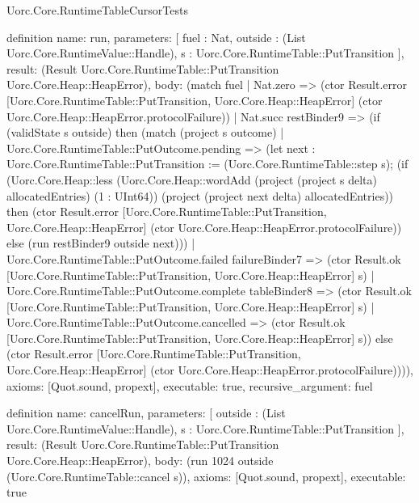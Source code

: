 \begin{lexlean}{Uorc.Core.RuntimeTableCursorTests}
\begin{semanticmodule}
definition{
  name: run,
  parameters: [
    fuel : Nat,
    outside : (List Uorc.Core.RuntimeValue::Handle),
    s : Uorc.Core.RuntimeTable::PutTransition
  ],
  result: (Result Uorc.Core.RuntimeTable::PutTransition Uorc.Core.Heap::HeapError),
  body: (match fuel
    | Nat.zero => (ctor Result.error [Uorc.Core.RuntimeTable::PutTransition, Uorc.Core.Heap::HeapError] (ctor Uorc.Core.Heap::HeapError.protocolFailure))
    | Nat.succ restBinder9 => (if (validState s outside) then (match (project s outcome)
      | Uorc.Core.RuntimeTable::PutOutcome.pending => (let next : Uorc.Core.RuntimeTable::PutTransition := (Uorc.Core.RuntimeTable::step s); (if (Uorc.Core.Heap::less (Uorc.Core.Heap::wordAdd (project (project s delta) allocatedEntries) (1 : UInt64)) (project (project next delta) allocatedEntries)) then (ctor Result.error [Uorc.Core.RuntimeTable::PutTransition, Uorc.Core.Heap::HeapError] (ctor Uorc.Core.Heap::HeapError.protocolFailure)) else (run restBinder9 outside next)))
      | Uorc.Core.RuntimeTable::PutOutcome.failed failureBinder7 => (ctor Result.ok [Uorc.Core.RuntimeTable::PutTransition, Uorc.Core.Heap::HeapError] s)
      | Uorc.Core.RuntimeTable::PutOutcome.complete tableBinder8 => (ctor Result.ok [Uorc.Core.RuntimeTable::PutTransition, Uorc.Core.Heap::HeapError] s)
      | Uorc.Core.RuntimeTable::PutOutcome.cancelled => (ctor Result.ok [Uorc.Core.RuntimeTable::PutTransition, Uorc.Core.Heap::HeapError] s)) else (ctor Result.error [Uorc.Core.RuntimeTable::PutTransition, Uorc.Core.Heap::HeapError] (ctor Uorc.Core.Heap::HeapError.protocolFailure)))),
  axioms: [Quot.sound, propext],
  executable: true,
  recursive_argument: fuel
}

definition{
  name: cancelRun,
  parameters: [
    outside : (List Uorc.Core.RuntimeValue::Handle),
    s : Uorc.Core.RuntimeTable::PutTransition
  ],
  result: (Result Uorc.Core.RuntimeTable::PutTransition Uorc.Core.Heap::HeapError),
  body: (run 1024 outside (Uorc.Core.RuntimeTable::cancel s)),
  axioms: [Quot.sound, propext],
  executable: true
}


\end{semanticmodule}
\end{lexlean}
